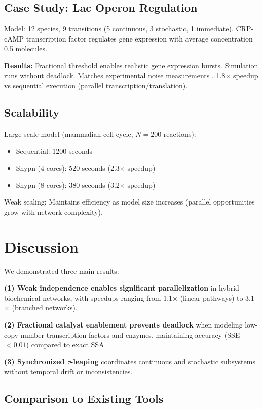 \documentclass{bioinfo}
\begin{document}
\subsection{Case Study: Lac Operon Regulation}

Model: 12 species, 9 transitions (5 continuous, 3 stochastic, 1 immediate). CRP-cAMP transcription factor regulates gene expression with average concentration 0.5 molecules.

\textbf{Results:} Fractional threshold enables realistic gene expression bursts. Simulation runs without deadlock. Matches experimental noise measurements \citep{elowitz2002stochastic}. 1.8$\times$ speedup vs sequential execution (parallel transcription/translation).

\subsection{Scalability}

Large-scale model (mammalian cell cycle, $N=200$ reactions):
\begin{itemize}
\item Sequential: 1200 seconds
\item Shypn (4 cores): 520 seconds (2.3$\times$ speedup)
\item Shypn (8 cores): 380 seconds (3.2$\times$ speedup)
\end{itemize}

Weak scaling: Maintains efficiency as model size increases (parallel opportunities grow with network complexity).

\section{Discussion}

We demonstrated three main results:

\textbf{(1) Weak independence enables significant parallelization} in hybrid biochemical networks, with speedups ranging from 1.1$\times$ (linear pathways) to 3.1$\times$ (branched networks).

\textbf{(2) Fractional catalyst enablement prevents deadlock} when modeling low-copy-number transcription factors and enzymes, maintaining accuracy (SSE $< 0.01$) compared to exact SSA.

\textbf{(3) Synchronized $\tau$-leaping} coordinates continuous and stochastic subsystems without temporal drift or inconsistencies.

\subsection{Comparison to Existing Tools}
\end{document}
